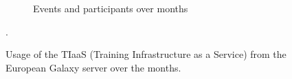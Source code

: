 \documentclass[10pt,letterpaper]{article}
\begin{document}
\begin{figure}[!ht]
\begin{subfigure}[b]{0.45\textwidth}
         \caption{Events and participants over months}
         \label{fig:tiaas-events}
    \end{subfigure}
	\caption{Usage of the TIaaS (Training Infrastructure as a Service) from the European Galaxy server over the months.}. 
	\label{fig:tiaas}
\end{figure}



\end{document}
